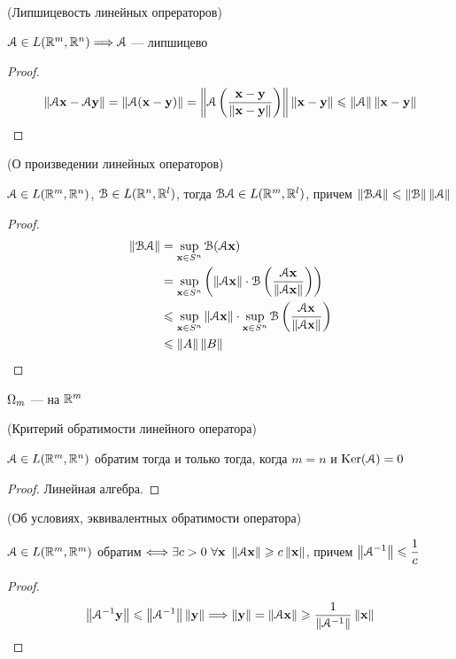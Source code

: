 \begin{theorem}(Липшицевость линейных опрераторов)

    $\cA \in L(\Rm, \Rn) \Lra \cA$ --- липшицево
\end{theorem}
\begin{proof}
\[
    \norm{\cA \x - \cA \y} = \norm{\cA(\x - \y)} = \norm{\cA \left(\frac{\x -
    \y}{\norm{\x - \y}}\right)} \norm{\x - \y} \leqslant \norm{\cA} \norm{\x - \y}
\]
\end{proof}

\begin{theorem}(О произведении линейных операторов)

    $\cA \in L(\Rm, \Rn)$, $\cB \in L(\Rn, \mathbb{R}^l)$, тогда
    $\cB \cA \in L(\Rm, \mathbb{R}^l)$, причем $\norm{\cB \cA} \leqslant
    \norm{\cB} \norm{\cA}$
\end{theorem}
\begin{proof}
    \begin{align*}
        \norm{\cB \cA} &= \sup_{\x \in S^n}{\cB(\cA \x)} \\
        &= \sup_{\x \in S^n}{\left(\norm{\cA \x} \cdot \cB\left(\frac{\cA
        \x}{\norm{\cA \x}}\right)\right)} \\
        &\leqslant \sup_{\x \in S^n}{\norm{\cA \x}} \cdot
        \sup_{\x \in S^n}{\cB\left(\frac{\cA \x}{\norm{\cA \x}}\right)} \\
        &\leqslant \norm{A} \norm{B}
    \end{align*}
\end{proof}

\begin{definition}
    $\O_m$ ---  на $\Rm$
\end{definition}

\begin{lemma}(Критерий обратимости линейного оператора)

    $\cA \in L(\Rm, \Rn)$ обратим тогда и только тогда, когда $m = n$ и
    $\Ker(\cA) = 0$
\end{lemma}
\begin{proof}
    Линейная алгебра.
\end{proof}

\begin{lemma}(Об условиях, эквивалентных обратимости оператора)

    $\cA \in L(\Rm, \Rm)$ обратим $\Llra \exists c>0~ \forall \x~ \norm{\cA \x}
    \geqslant c\norm{\x}$, причем $\displaystyle \norm{\cA^{-1}} \leqslant
    \frac{1}{c}$
\end{lemma}
\begin{proof}
\[
    \norm{\cA^{-1} \y} \leqslant \norm{\cA^{-1}} \norm{\y} \Lra \norm{\y} =
    \norm{\cA \x} \geqslant \frac{1}{\norm{\cA^{-1}}} \norm{\x}
\]
\end{proof}

